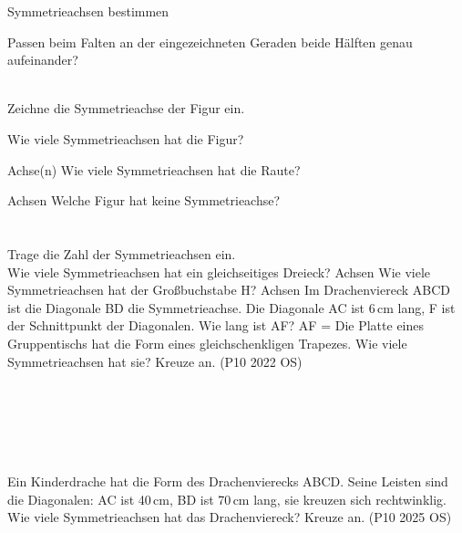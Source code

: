 \begin{aufgabe}{Symmetrieachsen bestimmen}
\begin{teile}
\teil Passen beim Falten an der eingezeichneten Geraden beide Hälften genau aufeinander? \\  \\ 

\teil Zeichne die Symmetrieachse der Figur ein.

\teil Wie viele Symmetrieachsen hat die Figur?

\leerfeld Achse(n)
\teil Wie viele Symmetrieachsen hat die Raute?

\leerfeld Achsen
\teil Welche Figur hat keine Symmetrieachse? \\  \\  \\ 
\teil Trage die Zahl der Symmetrieachsen ein. \\ 
\teil Wie viele Symmetrieachsen hat ein gleichseitiges Dreieck? \leerfeld Achsen
\teil Wie viele Symmetrieachsen hat der Großbuchstabe H? \leerfeld Achsen
\teil Im Drachenviereck ABCD ist die Diagonale BD die Symmetrieachse. Die Diagonale AC ist 6\,cm lang, F ist der Schnittpunkt der Diagonalen. Wie lang ist AF? AF = \leerfeld[cm]
\teil Die Platte eines Gruppentischs hat die Form eines gleichschenkligen Trapezes. Wie viele Symmetrieachsen hat sie? Kreuze an. \hfill (P10 2022 OS) \\  \\  \\  \\  \\  \\ 

\teil Ein Kinderdrache hat die Form des Drachenvierecks ABCD. Seine Leisten sind die Diagonalen: AC ist 40\,cm, BD ist 70\,cm lang, sie kreuzen sich rechtwinklig. Wie viele Symmetrieachsen hat das Drachenviereck? Kreuze an. \hfill (P10 2025 OS) \\  \\  \\  \\  \\ 

\end{teile}
\end{aufgabe}


